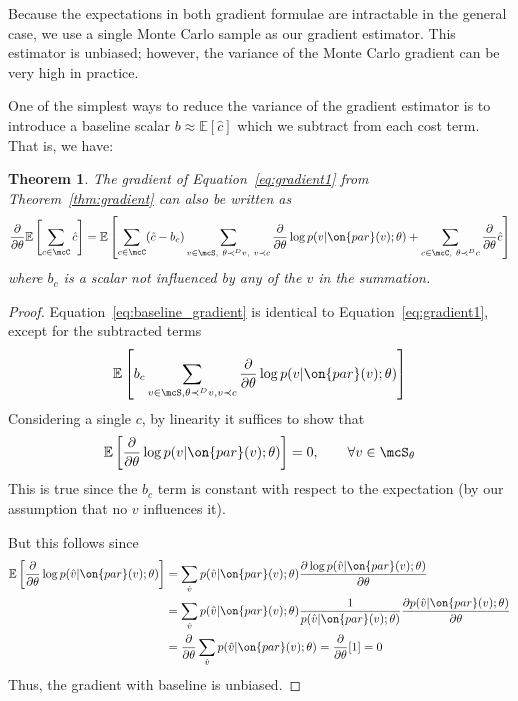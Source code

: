 \documentclass[12pt]{report}
\newtheorem{theorem}{Theorem}
\begin{document}
Because the expectations in both gradient formulae are intractable in the general case, we use a single Monte Carlo sample as our gradient estimator.
This estimator is unbiased; however, the variance of the Monte Carlo gradient can be very high in practice.



One of the simplest ways to reduce the variance of the gradient estimator is to introduce a baseline scalar $b \approx \mathbb{E}[\hat{c}]$ which we subtract from each cost term. That is, we have:
\begin{theorem}
The gradient of Equation~\ref{eq:gradient1} from Theorem~\ref{thm:gradient} can also be written as
\begin{equation}
\label{eq:baseline_gradient}
\frac{\partial}{\partial \theta} \mathbb{E}\left[ \sum_{c \in \mcC} \hat{c} \right] = \mathbb{E}\left[\sum_{c \in \mcC} (\hat{c} - b_c) \sum_{v \in \mcS,~\theta \prec^D v, ~v \prec c }  \frac{\partial}{\partial\theta} \log p(v | \on{par}(v) ; \theta )  +
 \sum_{c\in \mcC,~\theta \prec^D c} \frac{\partial}{\partial \theta} \hat{c}
\right] 
\end{equation}
where $b_c$ is a scalar not influenced by any of the $v$ in the summation.
\end{theorem}

\begin{proof}
Equation~\ref{eq:baseline_gradient} is identical to Equation~\ref{eq:gradient1}, except for the subtracted terms
$$\mathbb{E}\left[ b_c \sum_{v\in \mcS, \theta \prec^D v, v \prec c}\frac{\partial}{\partial\theta} \log p(v | \on{par}(v) ; \theta) \right]$$
Considering a single $c$, by linearity it suffices to show that
\begin{equation*}
\mathbb{E} \left[ \frac{\partial}{\partial\theta} \log p(v | \on{par}(v) ; \theta) \right] = 0, \qquad \forall v \in \mcS_\theta
\end{equation*}
This is true since the $b_c$ term is constant with respect to the expectation (by our assumption that no $v$ influences it).

But this follows since
\begin{align*}
\mathbb{E} \left[ \frac{\partial}{\partial \theta} \log p(\hat{v} | \on{par}(v); \theta) \right] &= \sum_{\hat{v}} p(\hat{v} | \on{par}(v); \theta) \frac{\partial \log p(\hat{v} | \on{par}(v); \theta)}{\partial \theta} \\
&=  \sum_{\hat{v}} p(\hat{v} | \on{par}(v); \theta) \frac{1}{p(\hat{v} | \on{par}(v); \theta)} \frac{\partial  p(\hat{v} | \on{par}(v); \theta)}{\partial \theta}  \\
&= \frac{\partial}{\partial \theta} \sum_{\hat{v}} p(\hat{v} | \on{par}(v); \theta) =  \frac{\partial}{\partial \theta} [1] = 0
\end{align*}
Thus, the gradient with baseline is unbiased.
\end{proof}
\end{document}
